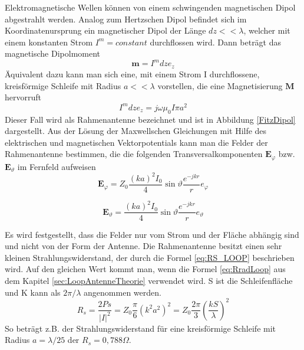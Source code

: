 Elektromagnetische Wellen können  von einem schwingenden magnetischen Dipol
abgestrahlt werden. Analog zum Hertzschen Dipol befindet sich im Koordinatenursprung
ein magnetischer Dipol der Länge $dz<<\lambda$, welcher mit einem konstanten
Strom $I^{m}=constant$ durchflossen wird. Dann beträgt das magnetische Dipolmoment
\begin{equation}
\textbf{m}=I^{m}dze_z
\end{equation}
Äquivalent dazu kann man sich eine, mit einem Strom I durchflossene, kreisförmige
Schleife mit Radius $a<<\lambda$ vorstellen, die eine Magnetisierung $\textbf{M}$ hervorruft
\begin{equation}
I^{m}dze_{z}=j\omega\mu_{0}I\pi a^{2}
\end{equation}
Dieser Fall wird als Rahmenantenne bezeichnet und ist in Abbildung \ref{FitzDipol} dargestellt. Aus der Lösung der Maxwellschen Gleichungen mit Hilfe des elektrischen und
magnetischen Vektorpotentials kann man die Felder der Rahmenantenne bestimmen,
die die folgenden Transversalkomponenten $\textbf{E}_{\varphi}$ bzw.$\textbf{E}_{\vartheta}$ im Fernfeld aufweisen
\begin{equation}
\textbf{E}_{\varphi}=Z_{0}\dfrac{(ka)^2I_{0}}{4}\sin \vartheta \dfrac{e^{-jkr}}{r} e_{\varphi}
\end{equation}

\begin{equation}
\textbf{E}_{\vartheta}=\dfrac{(ka)^2I_{0}}{4}\sin \vartheta \dfrac{e^{-jkr}}{r} e_{\vartheta}
\end{equation}

Es wird festgestellt, dass die Felder nur vom Strom und der Fläche abhängig sind
und nicht von der Form der Antenne. 
Die Rahmenantenne besitzt einen sehr kleinen Strahlungswiderstand, der durch die
Formel \ref{eq:RS_LOOP} beschrieben wird. Auf den gleichen Wert kommt man, wenn die Formel \ref{eq:RradLoop} aus dem Kapitel \ref{sec:LoopAntenneTheorie} verwendet wird. S ist die Schleifenfläche und K kann als $2\pi/\lambda$ angenommen werden.
\begin{equation}\label{eq:RS_LOOP}
R_{s}=\dfrac{2Ps}{|I|^{2}}=Z_{0}\dfrac{\pi}{6}(k^{2}a^{2})^{2}=Z_{0}\dfrac{2\pi}{3}\left(\dfrac{kS}{\lambda}\right)^{2} 
\end{equation}
So beträgt z.B. der Strahlungswiderstand für eine kreisförmige Schleife mit Radius $a = \lambda/25$ der  $R_{s} = 0,788\Omega$.


